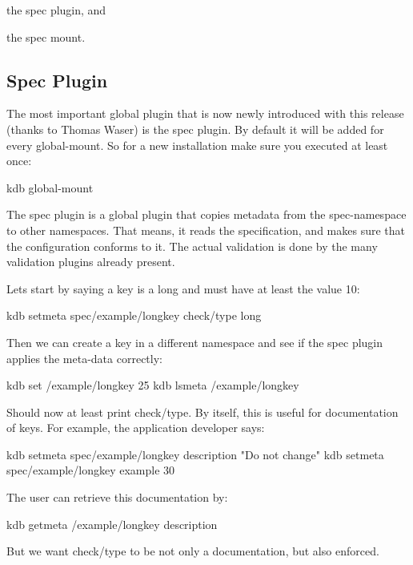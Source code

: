 \begin{DoxyEnumerate}
\item the spec plugin, and
\item the spec mount.
\end{DoxyEnumerate}

\subsection*{Spec Plugin}

The most important global plugin that is now newly introduced with this release (thanks to Thomas Waser) is the {\ttfamily spec} plugin. By default it will be added for every global-\/mount. So for a new installation make sure you executed at least once\+: \begin{DoxyVerb}    kdb global-mount
\end{DoxyVerb}


The spec plugin is a global plugin that copies metadata from the {\ttfamily spec}-\/namespace to other namespaces. That means, it reads the specification, and makes sure that the configuration conforms to it. The actual validation is done by the many validation plugins already present.

Lets start by saying a key is a long and must have at least the value 10\+: \begin{DoxyVerb}    kdb setmeta spec/example/longkey check/type long
\end{DoxyVerb}


Then we can create a key in a different namespace and see if the {\ttfamily spec} plugin applies the meta-\/data correctly\+: \begin{DoxyVerb}    kdb set /example/longkey 25
    kdb lsmeta /example/longkey
\end{DoxyVerb}


Should now at least print {\ttfamily check/type}. By itself, this is useful for documentation of keys. For example, the application developer says\+: \begin{DoxyVerb}    kdb setmeta spec/example/longkey description "Do not change"
    kdb setmeta spec/example/longkey example 30
\end{DoxyVerb}


The user can retrieve this documentation by\+: \begin{DoxyVerb}    kdb getmeta /example/longkey description
\end{DoxyVerb}


But we want {\ttfamily check/type} to be not only a documentation, but also enforced.

